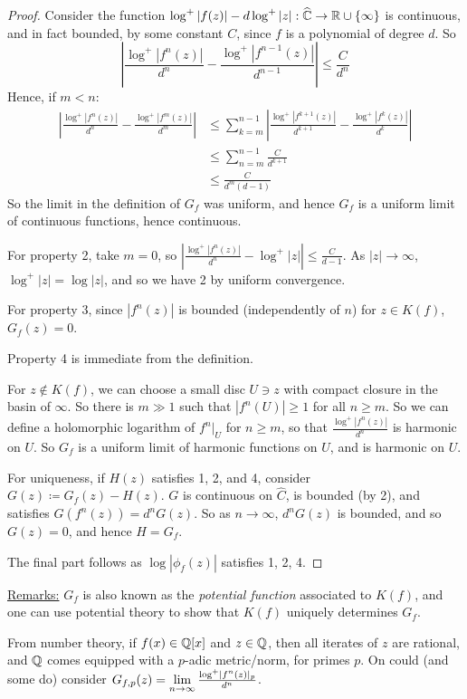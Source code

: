 \documentclass[10pt,a4paper]{article}
\begin{document}
\begin{proof}
  Consider the function $\log^+ |f(z)| - d\log^+ |z|: \widehat{\mathbb{C}} \to \mathbb{R} \cup \{\infty\}$ is continuous, and in fact bounded, by some constant $C$, since $f$ is a polynomial of degree $d$. So
  \[\left| \frac{\log^+|f^n(z)|}{d^n}-\frac{\log^+|f^{n-1}(z)|}{d^{n-1}}\right| \leq \frac{C}{d^n}\]
  Hence, if $m < n$:
  \begin{align*}
    \left| \frac{\log^+|f^n(z)|}{d^n}-\frac{\log^+|f^{m}(z)|}{d^{m}}\right| &\leq \sum_{k=m}^{n-1}\left| \frac{\log^+|f^{k+1}(z)|}{d^{k+1}}-\frac{\log^+|f^{k}(z)|}{d^{k}}\right|\\
    &\leq \sum_{n=m}^{n-1} \frac{C}{d^{k+1}}\\
    &\leq \frac{C}{d^m(d-1)}
  \end{align*}
  So the limit in the definition of $G_f$ was uniform, and hence $G_f$ is a uniform limit of continuous functions, hence continuous.

  For property 2, take $m=0$, so $\left|\frac{\log^+|f^n(z)|}{d^n} - \log^+|z|\right| \leq \frac{C}{d-1}$. As $|z| \to \infty$, $\log^+|z| = \log |z|$, and so we have 2 by uniform convergence.

  For property 3, since $|f^n(z)|$ is bounded (independently of $n$) for $z \in K(f)$, $G_f(z) = 0$.

  Property 4 is immediate from the definition.

  For $z \notin K(f)$, we can choose a small disc $U \ni z$ with compact closure in the basin of $\infty$. So there is $m \gg 1$ such that $|f^n(U)|\geq 1$ for all $n \geq m$. So we can define a holomorphic logarithm of $f^n|_U$ for $n\geq m$, so that $\frac{\log^+ |f^n(z)|}{d^n}$ is harmonic on $U$. So $G_f$ is a uniform limit of harmonic functions on $U$, and is harmonic on $U$.

  For uniqueness, if $H(z)$ satisfies 1, 2, and 4, consider $G(z)\coloneqq G_f(z) - H(z)$. $G$ is continuous on $\hat{C}$, is bounded (by 2), and satisfies $G(f^n(z)) = d^n G(z)$. So as $n \to \infty$, $d^n G(z)$ is bounded, and so $G(z) = 0$, and hence $H = G_f$.

  The final part follows as $\log|\phi_f(z)|$ satisfies 1, 2, 4.
\end{proof}
\underline{Remarks:} $G_f$ is also known as the \emph{potential function} associated to $K(f)$, and one can use potential theory to show that $K(f)$ uniquely determines $G_f$.

From number theory, if $f(x) \in \mathbb{Q}[x]$ and $z \in \mathbb{Q}$, then all iterates of $z$ are rational, and $\mathbb{Q}$ comes equipped with a $p$-adic metric/norm, for primes $p$. On could (and some do) consider $G_{f, p}(z) = \lim\limits_{n\to\infty} \frac{\log^+ \lvert f^n(z)\rvert_p}{d^n}$.
\end{document}
